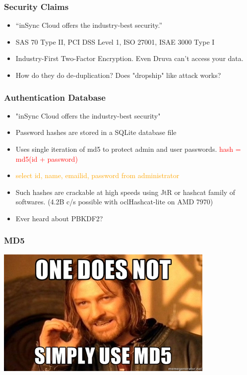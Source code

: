 \documentclass{beamer}
\begin{document}
\begin{frame}
	\frametitle{Security Claims}
	\begin{itemize}
		\item ``inSync Cloud offers the industry-best security.''
		\item SAS 70 Type II, PCI DSS Level 1, ISO 27001, ISAE 3000 Type I
		\item Industry-First Two-Factor Encryption. Even Druva can’t access your data.
		\item How do they do de-duplication? Does "dropship" like attack works?
	\end{itemize}
\end{frame}

\begin{frame}
	\frametitle{Authentication Database}
	\begin{itemize}
		\item "inSync Cloud offers the industry-best security"
		\item Password hashes are stored in a SQLite database file
		\item Uses single iteration of md5 to protect admin and user
		passwords. \textcolor{red}{hash = md5(id + password)}
		\item \textcolor{orange}{select id, name, emailid, password from administrator}
		\item Such hashes are crackable at high speeds using JtR
		or hashcat family of softwares. (4.2B c/s possible with
		oclHashcat-lite on AMD 7970)
		\item Ever heard about PBKDF2?
	\end{itemize}
\end{frame}

\begin{frame}
	\frametitle{MD5}
	\begin{center}
		\includegraphics[scale=1]{meme-md5}
	\end{center}
\end{frame}
\end{document}
